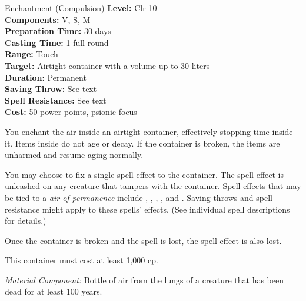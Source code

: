 {Enchantment (Compulsion)}
{
    \textbf{Level:}
    Clr 10\\
    \textbf{Components:}
    V, S, M\\
    \textbf{Preparation Time:}
    30 days\\
    \textbf{Casting Time:}
    1 full round\\
    \textbf{Range:}
    Touch\\
    \textbf{Target:}
    Airtight container with a volume up to 30 liters\\
    \textbf{Duration:}
    Permanent\\
    \textbf{Saving Throw:}
    See text\\
    \textbf{Spell Resistance:}
    See text\\
    \textbf{Cost:}
    50 power points, psionic focus\\
}
{
    You enchant the air inside an airtight container, effectively stopping time inside it. Items inside do not age or decay. If the container is broken, the items are unharmed and resume aging normally.

    You may choose to fix a single spell effect to the container. The spell effect is unleashed on any creature that tampers with the container. Spell effects that may be tied to a \emph{air of permanence} include , , , , and . Saving throws and spell resistance might apply to these spells' effects. (See individual spell descriptions for details.)

    Once the container is broken and the spell is lost, the spell effect is also lost.

    This container must cost at least 1,000 cp.

    \textit{Material Component:} Bottle of air from the lungs of a creature that has been dead for at least 100 years.
}

